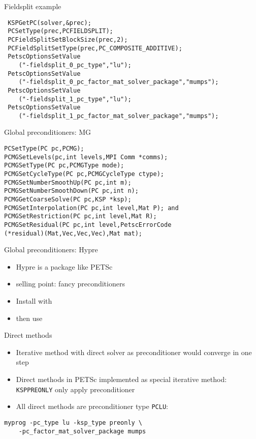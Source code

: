 \begin{numberedframe}{Fieldsplit example}
\begin{lstlisting}
 KSPGetPC(solver,&prec);
 PCSetType(prec,PCFIELDSPLIT);
 PCFieldSplitSetBlockSize(prec,2);
 PCFieldSplitSetType(prec,PC_COMPOSITE_ADDITIVE);
 PetscOptionsSetValue
    ("-fieldsplit_0_pc_type","lu");
 PetscOptionsSetValue
    ("-fieldsplit_0_pc_factor_mat_solver_package","mumps");
 PetscOptionsSetValue
    ("-fieldsplit_1_pc_type","lu");
 PetscOptionsSetValue
    ("-fieldsplit_1_pc_factor_mat_solver_package","mumps");
\end{lstlisting}
\end{numberedframe}

\begin{numberedframe}{Global preconditioners: MG}
\begin{lstlisting}
PCSetType(PC pc,PCMG);
PCMGSetLevels(pc,int levels,MPI Comm *comms);
PCMGSetType(PC pc,PCMGType mode);
PCMGSetCycleType(PC pc,PCMGCycleType ctype);
PCMGSetNumberSmoothUp(PC pc,int m);
PCMGSetNumberSmoothDown(PC pc,int n);
PCMGGetCoarseSolve(PC pc,KSP *ksp);
PCMGSetInterpolation(PC pc,int level,Mat P); and
PCMGSetRestriction(PC pc,int level,Mat R);
PCMGSetResidual(PC pc,int level,PetscErrorCode
(*residual)(Mat,Vec,Vec,Vec),Mat mat);
\end{lstlisting}
\end{numberedframe}

\begin{numberedframe}{Global preconditioners: Hypre}
  \begin{itemize}
  \item Hypre is a package like PETSc
  \item selling point: fancy preconditioners
  \item Install with 
  \item then use 
  \end{itemize}
  
\end{numberedframe}

\begin{details}
\begin{numberedframe}{Direct methods}
  \begin{itemize}
  \item Iterative method with direct solver as preconditioner would
    converge in one step
  \item Direct methods in PETSc implemented as special iterative
    method: \lstinline{KSPPREONLY} only apply preconditioner
  \item All direct methods are preconditioner type \lstinline{PCLU}: 
  \end{itemize}
\begin{verbatim}
myprog -pc_type lu -ksp_type preonly \
    -pc_factor_mat_solver_package mumps 
\end{verbatim}
\end{numberedframe}

\end{details}

